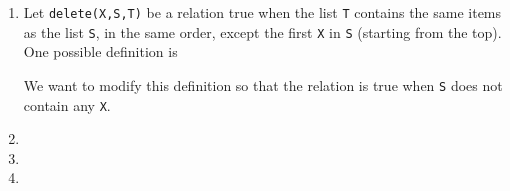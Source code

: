 \documentclass[11pt,a4paper]{article}
\author{Christian Rinderknecht}
\date{14 December 2006}
\begin{document}
\maketitle
\thispagestyle{empty}

\begin{enumerate}

  \item Let \texttt{delete(X,S,T)} be a relation true when the list
    \texttt{T} contains the same items as the list \texttt{S}, in the
    same order, except the first \texttt{X} in \texttt{S} (starting
    from the top). One possible definition is

    \noindent We want to modify this definition so that the relation
    is true when \texttt{S} does not contain any \texttt{X}.
 
    

  \item
    

  \item 
    

  \item 
    

\end{enumerate}
\end{document}

